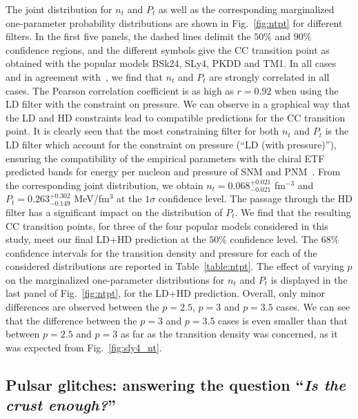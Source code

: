 The joint distribution for $n_t$ and $P_t$ as well as the corresponding 
marginalized one-parameter probability distributions are shown in 
Fig.~\ref{fig:ntpt} for different filters. In the first five panels, the dashed
lines delimit the $50\%$ and $90\%$ confidence regions, and the different 
symbols give the CC transition point as obtained with the popular models BSk24, 
SLy4, PKDD and TM1. 
In all cases and in agreement with~\cite{Carreau2019cc}, we find that $n_t$ and 
$P_t$ are strongly correlated in all cases. The Pearson correlation coefficient 
is as high as $r=0.92$ when using the LD filter with the constraint on 
pressure.
We can observe in a graphical way that the LD and HD constraints lead to 
compatible predictions for the CC transition point. It is clearly seen that the 
most constraining filter for both $n_t$ and $P_t$ is the LD filter which 
account for the constraint on pressure (``LD (with pressure)''), ensuring the 
compatibility of the empirical parameters with the chiral ETF predicted 
bands for energy per nucleon and pressure of SNM and PNM~\cite{Drischler2016}.
From the corresponding joint distribution, we obtain 
$n_t = 0.068_{-0.021}^{+0.021}$ fm$^{-3}$ and $P_t = 0.263_{-0.149}^{+0.302}$ 
MeV/fm$^3$ at the $1\sigma$ confidence level. The passage through the HD filter 
has a significant impact on the distribution of $P_t$. 
We find that the resulting CC transition points, for three of the four popular 
models considered in this study, meet our final LD+HD prediction at the $50\%$
confidence level.
The $68\%$ confidence intervals for 
the transition density and pressure for each of the considered distributions 
are reported in Table~\ref{table:ntpt}.
The effect of varying $p$ on the marginalized one-parameter distributions for
$n_t$ and $P_t$ is displayed in the last panel of Fig.~\ref{fig:ntpt}, for the
LD+HD prediction. Overall, only minor differences are observed between the 
$p=2.5$, $p=3$ and $p=3.5$ cases. We can see that the difference between the 
$p=3$ and $p=3.5$ cases is even smaller than that between 
$p=2.5$ and $p=3$ as far as the transition density was concerned, as it was 
expected from Fig.~\ref{fig:sly4_nt}.

\subsection{Pulsar glitches: answering the question
``\textit{Is the crust enough?}''}\label{subsec:gli_stats}

